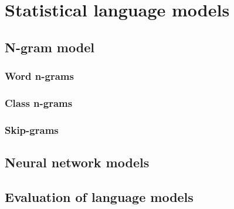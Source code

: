 \chapter{Statistical language models}
\label{chapter:lm}

\section{N-gram model}
\subsection{Word n-grams}
\subsection{Class n-grams}
\subsection{Skip-grams}

\section{Neural network models}

\section{Evaluation of language models}


